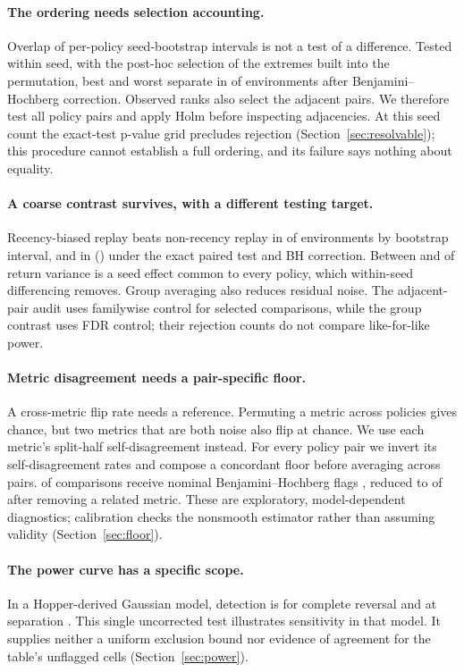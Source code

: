 \documentclass{article}
\begin{document}
\paragraph{The ordering needs selection accounting.}
Overlap of per-policy seed-bootstrap intervals is not a test of a difference.
Tested within seed, with the post-hoc selection of the extremes built into
the permutation, best and worst separate in \ExtremesBH{} of \NEnv{}
environments after Benjamini--Hochberg correction. Observed ranks also select
the adjacent pairs. We therefore test all policy pairs and apply Holm before
inspecting adjacencies. At this seed count the exact-test p-value grid
precludes rejection (Section~\ref{sec:resolvable}); this procedure cannot
establish a full ordering, and its failure says nothing about equality.

\paragraph{A coarse contrast survives, with a different testing target.}
Recency-biased replay beats non-recency replay in \ContrastUncorrected{} of
\NEnv{} environments by bootstrap interval, and in \ContrastBH{}
(\ContrastBHList{}) under the exact paired test and BH correction.
Between \IccMin{} and \IccMax{} of return variance is a seed effect common to
every policy, which within-seed differencing removes. Group averaging also
reduces residual noise. The adjacent-pair audit uses familywise control for
selected comparisons, while the group contrast uses FDR control; their
rejection counts do not compare like-for-like power.

\paragraph{Metric disagreement needs a pair-specific floor.}
A cross-metric flip rate needs a reference. Permuting a metric across policies
gives chance, but two metrics that are both noise also flip at chance. We use
each metric's split-half self-disagreement instead. For every policy pair we
invert its self-disagreement rates and compose a concordant floor before
averaging across pairs. \NBH{} of \NTests{} comparisons receive nominal
Benjamini--Hochberg flags \citep{benjamini1995fdr}, reduced to \NBHDrop{} of
\NDistinct{} after removing a related metric. These are exploratory,
model-dependent diagnostics; calibration checks the nonsmooth estimator
rather than assuming validity (Section~\ref{sec:floor}).

\paragraph{The power curve has a specific scope.}
In a Hopper-derived Gaussian model, detection is \PowerFullReversal{} for
complete reversal and \PowerWeakRate{} at separation \PowerWeakSep{}.
This single uncorrected test illustrates sensitivity in that model. It
supplies neither a uniform exclusion bound nor evidence of agreement for
the table's unflagged cells (Section~\ref{sec:power}).
\end{document}
